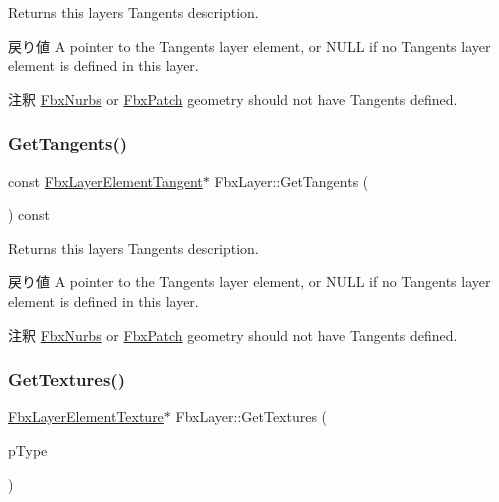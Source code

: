 Returns this layer\textquotesingle{}s Tangents description. \begin{DoxyReturn}{戻り値}
A pointer to the Tangents layer element, or {\ttfamily N\+U\+LL} if no Tangents layer element is defined in this layer. 
\end{DoxyReturn}
\begin{DoxyRemark}{注釈}
\hyperlink{class_fbx_nurbs}{Fbx\+Nurbs} or \hyperlink{class_fbx_patch}{Fbx\+Patch} geometry should not have Tangents defined. 
\end{DoxyRemark}
\mbox{\label{class_fbx_layer_ad5fbd299340cc987a8202f28d64fb341}} 
\subsubsection{\texorpdfstring{Get\+Tangents()}{GetTangents()}\hspace{0.1cm}{\footnotesize\ttfamily [2/2]}}
{\footnotesize\ttfamily const \hyperlink{class_fbx_layer_element_tangent}{Fbx\+Layer\+Element\+Tangent}$\ast$ Fbx\+Layer\+::\+Get\+Tangents (\begin{DoxyParamCaption}{ }\end{DoxyParamCaption}) const}

Returns this layer\textquotesingle{}s Tangents description. \begin{DoxyReturn}{戻り値}
A pointer to the Tangents layer element, or {\ttfamily N\+U\+LL} if no Tangents layer element is defined in this layer. 
\end{DoxyReturn}
\begin{DoxyRemark}{注釈}
\hyperlink{class_fbx_nurbs}{Fbx\+Nurbs} or \hyperlink{class_fbx_patch}{Fbx\+Patch} geometry should not have Tangents defined. 
\end{DoxyRemark}
\mbox{\label{class_fbx_layer_a6c407cd486b08abafb7d966e9bb8dcf6}} 
\subsubsection{\texorpdfstring{Get\+Textures()}{GetTextures()}\hspace{0.1cm}{\footnotesize\ttfamily [1/2]}}
{\footnotesize\ttfamily \hyperlink{class_fbx_layer_element_texture}{Fbx\+Layer\+Element\+Texture}$\ast$ Fbx\+Layer\+::\+Get\+Textures (\begin{DoxyParamCaption}\item[{\hyperlink{class_fbx_layer_element_a8c95c5cd880b56c776acd379bd86f42c}{Fbx\+Layer\+Element\+::\+E\+Type}}]{p\+Type }\end{DoxyParamCaption})}

